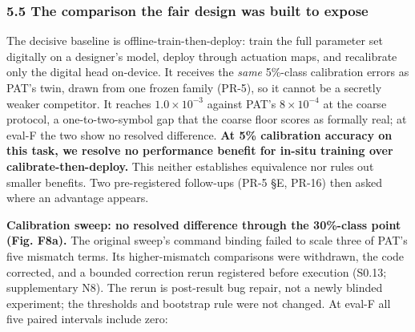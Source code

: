 \documentclass[
  10pt,
]{article}
\begin{document}
\subsubsection{5.5 The comparison the fair design was built to
expose}\label{the-comparison-the-fair-design-was-built-to-expose}

The decisive baseline is offline-train-then-deploy: train the full
parameter set digitally on a designer's model, deploy through actuation
maps, and recalibrate only the digital head on-device. It receives the
\emph{same} 5\%-class calibration errors as PAT's twin, drawn from one
frozen family (PR-5), so it cannot be a secretly weaker competitor. It
reaches \(1.0\times10^{-3}\) against PAT's \(8\times10^{-4}\) at the
coarse protocol, a one-to-two-symbol gap that the coarse floor scores as
formally real; at eval-F the two show no resolved difference. \textbf{At
5\% calibration accuracy on this task, we resolve no performance benefit
for in-situ training over calibrate-then-deploy.} This neither
establishes equivalence nor rules out smaller benefits. Two
pre-registered follow-ups (PR-5 §E, PR-16) then asked where an advantage
appears.

\textbf{Calibration sweep: no resolved difference through the 30\%-class
point (Fig. F8a).} The original sweep's command binding failed to scale
three of PAT's five mismatch terms. Its higher-mismatch comparisons were
withdrawn, the code corrected, and a bounded correction rerun registered
before execution (S0.13; supplementary N8). The rerun is post-result bug
repair, not a newly blinded experiment; the thresholds and bootstrap
rule were not changed. At eval-F all five paired intervals include zero:
\end{document}
